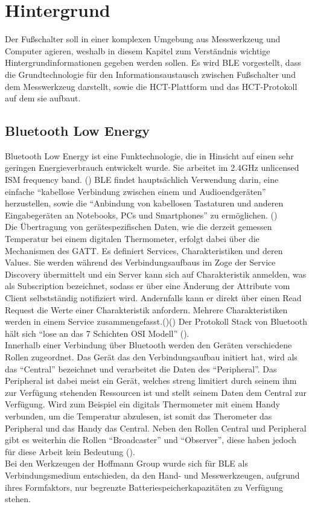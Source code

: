 \section{Hintergrund}
\label{Hintergrund}
Der Fußschalter soll in einer komplexen Umgebung aus Messwerkzeug und Computer agieren, weshalb in diesem Kapitel zum Verständnis wichtige Hintergrundinformationen gegeben werden sollen. Es wird \ac{BLE} vorgestellt, dass die Grundtechnologie für den Informationsaustausch zwischen Fußschalter und dem Messwerkzeug darstellt, sowie die \ac{HCT}-Plattform und das \ac{HCT}-Protokoll auf dem sie aufbaut.

\subsection{Bluetooth Low Energy}
Bluetooth Low Energy ist eine Funktechnologie, die in Hinsicht auf einen sehr geringen Energieverbrauch entwickelt wurde. Sie arbeitet im 2.4GHz unlicensed ISM frequency band. (\cite[]{Bluetooth_Wireless_Technology}) \ac{BLE} findet hauptsächlich Verwendung darin, eine einfache ``kabellose Verbindung zwischen einem und Audioendgeräten'' herzustellen, sowie die ``Anbindung von kabellosen Tastaturen und anderen Eingabegeräten an Notebooks, PCs und Smartphones'' zu ermöglichen. (\cite[S. 339]{Grundkurs_mobile_Kommunikation})\\
Die Übertragung von gerätespezifischen Daten, wie die derzeit gemessen Temperatur bei einem digitalen Thermometer, erfolgt dabei über die Mechanismen des \ac{GATT}. Es definiert Services, Charakteristiken und deren Values. Sie werden während des Verbindungsaufbaus im Zoge der Service Discovery übermittelt und ein Server kann sich auf Charakteristik anmelden, was als Subscription bezeichnet, sodass er über eine Änderung der Attribute vom Client selbstständig notifiziert wird. Andernfalls kann er direkt über einen Read Request die Werte einer Charakteristik anfordern. Mehrere Charakteristiken werden in einem Service zusammengefasst.(\cite[S. 1459]{Bluetooth_Core_Specification})(\cite[]{Overview_and_Evaluation_of_BLE}) Der Protokoll Stack von Bluetooth hält sich ``lose an das 7 Schichten OSI Modell'' (\cite[S. 347]{Grundkurs_mobile_Kommunikation}).\\
Innerhalb einer Verbindung über Bluetooth werden den Geräten verschiedene Rollen zugeordnet. Das Gerät das den Verbindungsaufbau initiert hat, wird als das ``Central'' bezeichnet und verarbeitet die Daten des ``Peripheral''. Das Peripheral ist dabei meist ein Gerät, welches streng limitiert durch seinem ihm zur Verfügung stehenden Ressourcen ist und stellt seinem Daten dem Central zur Verfügung. Wird zum Beispiel ein digitals Thermometer mit einem Handy verbunden, um die Temperatur abzulesen, ist somit das Therometer das Peripheral und das Handy das Central. Neben den Rollen Central und Peripheral gibt es weiterhin die Rollen ``Broadcaster'' und ``Observer'', diese haben jedoch für diese Arbeit kein Bedeutung (\cite[S. 1246]{Bluetooth_Core_Specification}).\\
Bei den Werkzeugen der Hoffmann Group wurde sich für \ac{BLE} als Verbindungsmedium entschieden, da den Hand- und Messwerkzeugen, aufgrund ihres Formfaktors, nur begrenzte Batteriespeicherkapazitäten zu Verfügung stehen.

